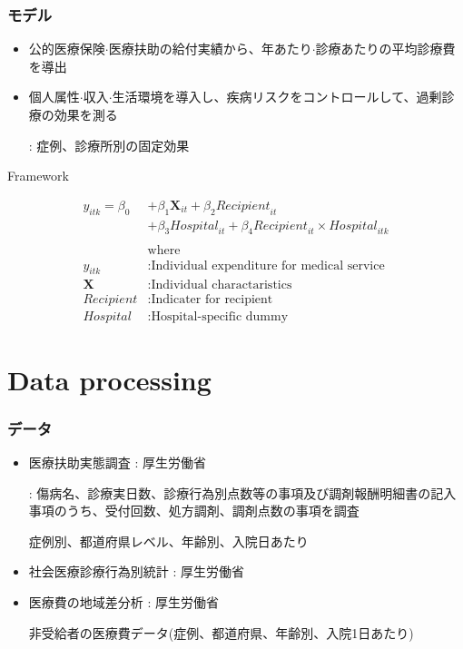 \documentclass[dvipdfmx,14pt]{beamer}
\begin{document}
\begin{frame}\frametitle{モデル}

 \begin{itemize}
 
 \item 公的医療保険$\cdot$医療扶助の給付実績から、年あたり$\cdot$診療あたりの平均診療費を導出
 
 \item 個人属性$\cdot$収入$\cdot$生活環境を導入し、疾病リスクをコントロールして、過剰診療の効果を測る
 
 : 症例、診療所別の固定効果
 
 \end{itemize}

\end{frame}

\begin{frame}{Framework}

 \begin{align*}
  y_{itk} = \beta_0 &+ \beta_1 \mathbf{X}_{it} + \beta_2 \textit{Recipient}_{it}  \\
 & + \beta_3 \textit{Hospital}_{it} + \beta_4  \textit{Recipient}_{it} \times \textit{Hospital}_{itk}  \\
    \\
    & \text{where} \\
  y_{itk} &: \text{Individual expenditure for medical service} \\
  \mathbf{X} &: \text{Individual charactaristics} \\
  \textit{Recipient} & : \text{Indicater for recipient} \\
  \textit{Hospital} & : \text{Hospital-specific dummy}
  \end{align*}

\end{frame}

\section{Data processing}
\begin{frame}\frametitle{データ}

 \begin{itemize}
 
 \item 医療扶助実態調査 : 厚生労働省
 
  : 傷病名、診療実日数、診療行為別点数等の事項及び調剤報酬明細書の記入事項のうち、受付回数、処方調剤、調剤点数の事項を調査
  
  症例別、都道府県レベル、年齢別、入院日あたり
  
\item 社会医療診療行為別統計 : 厚生労働省

\item 医療費の地域差分析 : 厚生労働省

非受給者の医療費データ(症例、都道府県、年齢別、入院1日あたり)
 
 \end{itemize}

\end{frame}
\end{document}
